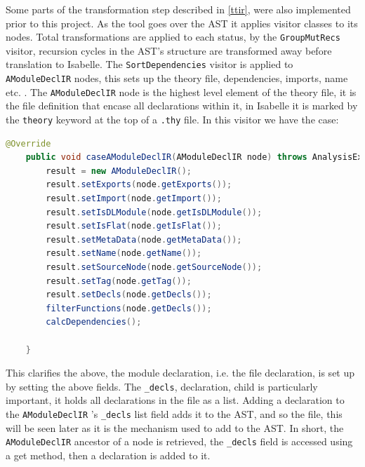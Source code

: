 	Some parts of the transformation step described in \ref{ttir}, were also implemented prior to this project.	As the tool goes over the AST it applies visitor classes to its nodes. Total transformations are applied to each status, by the  \lstinline[language=Java]{GroupMutRecs} visitor, recursion cycles in the AST's structure are transformed away before translation to Isabelle. The \lstinline[language=Java]{SortDependencies} visitor is applied to \lstinline[language=Java]{AModuleDeclIR} nodes, this sets up the theory file, dependencies, imports, name etc. . The \lstinline[language=Java]{AModuleDeclIR} node is the highest level element of the theory file, it is the file definition that encase all declarations within it, in Isabelle it is marked by the \lstinline[language=Isabelle, mathescape]{theory} keyword at the top of a \lstinline[language=Isabelle, mathescape]{.thy} file. In this visitor we have the case: 
	\begin{lstlisting}[language=Java]
	@Override
    public void caseAModuleDeclIR(AModuleDeclIR node) throws AnalysisException {
        result = new AModuleDeclIR();
        result.setExports(node.getExports());
        result.setImport(node.getImport());
        result.setIsDLModule(node.getIsDLModule());
        result.setIsFlat(node.getIsFlat());
        result.setMetaData(node.getMetaData());
        result.setName(node.getName());
        result.setSourceNode(node.getSourceNode());
        result.setTag(node.getTag());
        result.setDecls(node.getDecls());
        filterFunctions(node.getDecls());
        calcDependencies();

    }
    \end{lstlisting}
    This clarifies the above, the module declaration, i.e. the file declaration, is set up by setting the above fields. The \lstinline[language=Java]{_decls}, declaration, child is particularly important, it holds all declarations in the file as a list. Adding a declaration to the \lstinline[language=Java]{AModuleDeclIR} 's \lstinline[language=Java]{_decls} list field adds it to the AST, and so the file, this will be seen later as it is the mechanism used to add to the AST. In short, the \lstinline[language=Java]{AModuleDeclIR} ancestor of a node is retrieved, the \lstinline[language=Java]{_decls} field is accessed using a get method, then a declaration is added to it.

